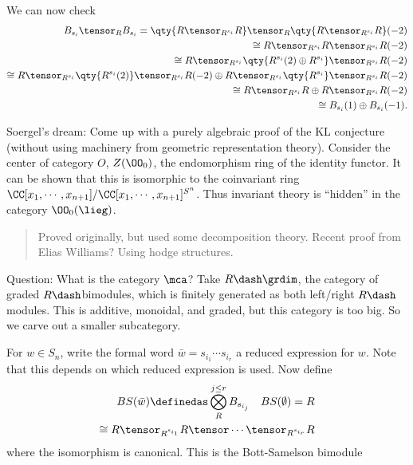 We can now check \begin{align*}
B_{s_i} \tensor_R B_{s_i} 
=
\qty{R \tensor_{R^{s_i}} R} \tensor_R 
\qty{R \tensor_{R^{s_i}} R}(-2) \\
\cong R \tensor_{R^{s_i}} R \tensor_{R^{s_i}} R(-2) \\
\cong R \tensor_{R^{s_i}} \qty{ R^{s_i}(2) \oplus R^{s_i}  } \tensor_{R^{s_i}} R(-2) \\
\cong R \tensor_{R^{s_i}} \qty{ R^{s_i}(2)   } \tensor_{R^{s_i}} R(-2)  \oplus
R \tensor_{R^{s_i}} \qty{ R^{s_i}  } \tensor_{R^{s_i}} R(-2) \\
\cong R \tensor_{R^{s_i}} R \oplus R\tensor_{R^{s_i}} R(-2) \\
\cong B_{s_i}(1) \oplus B_{s_i}(-1)
.\end{align*}

Soergel's dream: Come up with a purely algebraic proof of the KL
conjecture (without using machinery from geometric representation
theory). Consider the center of category \(O\), \(Z(\OO_0)\), the
endomorphism ring of the identity functor. It can be shown that this is
isomorphic to the coinvariant ring
\(\CC[x_1, \cdots, x_{n+1}] / \CC[x_1, \cdots, x_{n+1}]^{S^n}\). Thus
invariant theory is ``hidden'' in the category \(\OO_0(\lieg)\).

\begin{quote}
Proved originally, but used some decomposition theory. Recent proof from
Elias Williams? Using hodge structures.
\end{quote}

Question: What is the category \(\mca\)? Take \(R\dash\grdim\), the
category of graded \(R\dash\)bimodules, which is finitely generated as
both left/right \(R\dash\)modules. This is additive, monoidal, and
graded, but this category is too big. So we carve out a smaller
subcategory.

For \(w\in S_n\), write the formal word
\(\bar w = s_{i_1} \cdots s_{i_r}\) a reduced expression for \(w\). Note
that this depends on which reduced expression is used. Now define
\begin{align*}
BS(\bar w) \definedas \bigotimes_R^{j\leq r} B_{s_{i_j}}  \quad BS(\emptyset) = R \\
\cong R \tensor_{R^{s_{i_1}}} R \tensor \cdots \tensor_{R^{s_{i_r}}} R
\end{align*} where the isomorphism is canonical. This is the
Bott-Samelson bimodule

